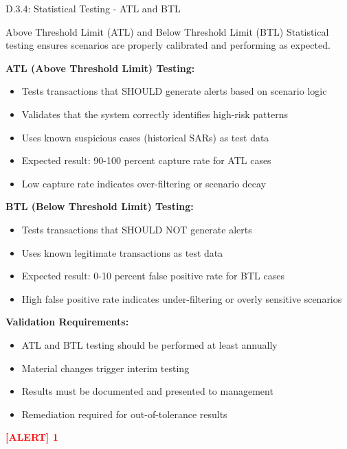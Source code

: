 \documentclass[11pt,a4paper]{beamer}
\newcommand{\redflag}[1]{\textcolor{red}{\textbf{[ALERT] 1}}}
\begin{document}
\begin{frame}{D.3.4: Statistical Testing - ATL and BTL}
	\begin{block}{Above Threshold Limit (ATL) and Below Threshold Limit (BTL)}
		Statistical testing ensures scenarios are properly calibrated and performing as expected.
	\end{block}
	\textbf{ATL (Above Threshold Limit) Testing:}
	\begin{itemize}
		\item Tests transactions that SHOULD generate alerts based on scenario logic
		\item Validates that the system correctly identifies high-risk patterns
		\item Uses known suspicious cases (historical SARs) as test data
		\item Expected result: 90-100 percent capture rate for ATL cases
		\item Low capture rate indicates over-filtering or scenario decay
	\end{itemize}
	\textbf{BTL (Below Threshold Limit) Testing:}
	\begin{itemize}
		\item Tests transactions that SHOULD NOT generate alerts
		\item Uses known legitimate transactions as test data
		\item Expected result: 0-10 percent false positive rate for BTL cases
		\item High false positive rate indicates under-filtering or overly sensitive scenarios
	\end{itemize}
	\textbf{Validation Requirements:}
	\begin{itemize}
		\item ATL and BTL testing should be performed at least annually
		\item Material changes trigger interim testing
		\item Results must be documented and presented to management
		\item Remediation required for out-of-tolerance results
	\end{itemize}
	\redflag{Banks that skip ATL/BTL testing cannot demonstrate scenario effectiveness.}
\end{frame}
\end{document}
